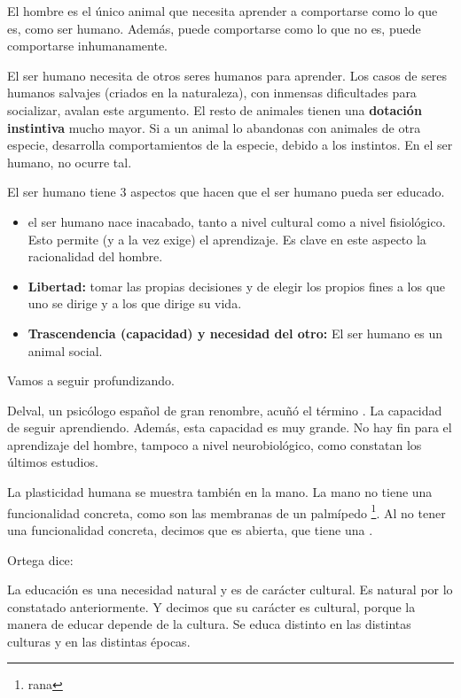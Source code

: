 \documentclass[palatino]{apuntesURJC}
\begin{document}
El hombre es el único animal que necesita aprender a comportarse como lo que es, como ser humano.
%
Además, puede comportarse como lo que no es, puede comportarse inhumanamente.

El ser humano necesita de otros seres humanos para aprender.
%
Los casos de seres humanos salvajes (criados en la naturaleza), con inmensas dificultades para socializar, avalan este argumento.
%
El resto de animales tienen una \textbf{dotación instintiva} mucho mayor.
%
Si a un animal lo abandonas con animales de otra especie, desarrolla comportamientos de la especie, debido a los instintos.
%
En el ser humano, no ocurre tal.

El ser humano tiene 3 aspectos que hacen que el ser humano pueda ser educado.
\begin{itemize}
	\item \textbf{} el ser humano nace inacabado, tanto a nivel cultural como a nivel fisiológico.
	Esto permite (y a la vez exige) el aprendizaje.
	\subitem Es clave en este aspecto la racionalidad del hombre.
	\item \textbf{Libertad:} tomar las propias decisiones y de elegir los propios fines a los que uno se dirige y a los que dirige su vida.
	\item \textbf{Trascendencia (capacidad) y necesidad del otro:} El ser humano es un animal social.
\end{itemize}

Vamos a seguir profundizando.

Delval, un psicólogo español de gran renombre, acuñó el término .
%
La capacidad de seguir aprendiendo. Además, esta capacidad es muy grande.
%
No hay fin para el aprendizaje del hombre, tampoco a nivel neurobiológico, como constatan los últimos estudios.

La plasticidad humana se muestra también en la mano.
%
La mano no tiene una funcionalidad concreta, como son las membranas de un palmípedo \footnote{rana}.
%
Al no tener una funcionalidad concreta, decimos que es abierta, que tiene una .


Ortega dice:

La educación es una necesidad natural y es de carácter cultural.
%
Es natural por lo constatado anteriormente.
%
Y decimos que su carácter es cultural, porque la manera de educar depende de la cultura.
%
Se educa distinto en las distintas culturas y en las distintas épocas.
\end{document}
